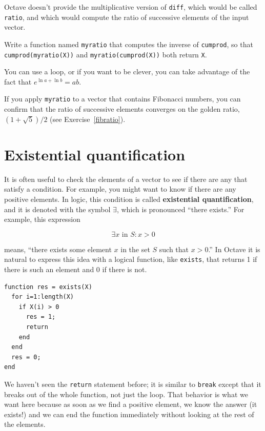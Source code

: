 \documentclass{book}
\begin{document}
Octave doesn't provide the multiplicative version
of {\tt diff}, which would be called {\tt ratio}, and which would
compute the ratio of successive elements of the input vector.

\begin{ex}
Write a function named {\tt myratio} that computes the
inverse of {\tt cumprod}, so that {\tt cumprod(myratio(X))} and
{\tt myratio(cumprod(X))} both
return {\tt X}.

You can use a loop, or if you want to be clever, you can take
advantage of the fact that $e^{\ln a + \ln b} = a b$.

If you apply {\tt myratio} to a vector that contains Fibonacci
numbers, you can confirm that the ratio of successive elements
converges on the golden ratio, $(1+\sqrt{5})/2$ (see
Exercise~\ref{fibratio}).
\end{ex}



\section{Existential quantification}

It is often useful to check the elements of a vector to see if there
are any that satisfy a condition. For example, you might want to
know if there are any positive elements. In logic, this condition
is called {\bf existential quantification}, and it is denoted with
the symbol $\exists$, which is pronounced ``there exists.'' For example,
this expression

\[ \exists x \mbox{~in~} S: x>0 \]

means, ``there exists some element $x$ in the set $S$ such that
$x>0$.'' In Octave it is natural to express this idea with a logical
function, like {\tt exists}, that returns 1 if there is such an
element and 0 if there is not.

\begin{verbatim}
function res = exists(X)
  for i=1:length(X)
    if X(i) > 0
      res = 1;
      return
    end
  end
  res = 0;
end
\end{verbatim}

We haven't seen the {\tt return} statement before; it is similar
to {\tt break} except that it breaks out of the whole function, not
just the loop. That behavior is what we want here because as soon
as we find a positive element, we know the answer (it exists!) and
we can end the function immediately without looking at the rest
of the elements.
\end{document}

